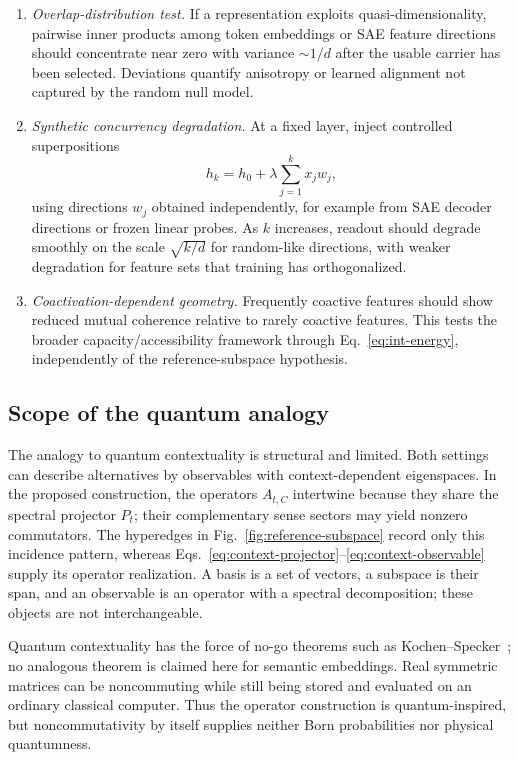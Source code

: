 \documentclass[
  aps,
  reprint,
  superscriptaddress,
  floatfix,
  nofootinbib,
  longbibliography
]{revtex4-2}
\begin{document}
\begin{enumerate}
\item \emph{Overlap-distribution test.}
If a representation exploits quasi-dimensionality, pairwise inner
products among token embeddings or SAE feature directions should
concentrate near zero with variance $\sim1/d$ after the usable carrier has
been selected. Deviations quantify anisotropy or learned alignment not
captured by the random null model.

\item \emph{Synthetic concurrency degradation.}
At a fixed layer, inject controlled superpositions
%
\begin{equation}
h_k=h_0+\lambda\sum_{j=1}^k x_j w_j,
\end{equation}
%
using directions $w_j$ obtained independently, for example from SAE
decoder directions or frozen linear probes. As $k$ increases, readout
should degrade smoothly on the scale $\sqrt{k/d}$ for random-like
directions, with weaker degradation for feature sets that training has
orthogonalized.

\item \emph{Coactivation-dependent geometry.}
Frequently coactive features should show reduced mutual coherence
relative to rarely coactive features. This tests the broader
capacity/accessibility framework through Eq.~\eqref{eq:int-energy},
independently of the reference-subspace hypothesis.
\end{enumerate}

\subsection{Scope of the quantum analogy}
\label{sec:quantum}

The analogy to quantum contextuality is structural and limited. Both settings
can describe alternatives by observables with context-dependent eigenspaces.
In the proposed construction, the operators $A_{t,C}$ intertwine because they
share the spectral projector $P_t$; their complementary sense sectors may
yield nonzero commutators.  The hyperedges in
Fig.~\ref{fig:reference-subspace} record only this incidence pattern, whereas
Eqs.~\eqref{eq:context-projector}--\eqref{eq:context-observable} supply its
operator realization.  A basis is a set of vectors, a subspace is their span,
and an observable is an operator with a spectral decomposition; these objects
are not interchangeable.

Quantum contextuality has the force of no-go theorems such as
Kochen--Specker~\cite{specker-60,kochen1}; no analogous theorem is claimed
here for semantic embeddings.  Real symmetric matrices can be noncommuting
while still being stored and evaluated on an ordinary classical computer.
Thus the operator construction is quantum-inspired, but noncommutativity by
itself supplies neither Born probabilities nor physical quantumness.
\end{document}

